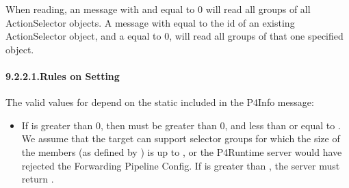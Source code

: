 \documentclass[11pt]{article}
\begin{document}
{%
When reading, an  message with  and
 equal to 0 will read all groups of all ActionSelector objects.  A
message with  equal to the id of an existing ActionSelector
object, and a  equal to 0, will read all groups of that one specified
object.%

\paragraph{9.2.2.1.\hspace*{0.5em}Rules on Setting }\label{sec-max-size-rules}%

\noindent{}The valid values for  depend on the static  included
in the P4Info message:%

\begin{itemize}%

\item{}
If  is greater than 0, then  must be greater than 0,
and less than or equal to . We assume that the target can
support selector groups for which the size of the members (as defined by
) is up to , or the P4Runtime server
would have rejected the Forwarding Pipeline Config. If  is greater
than , the server must return .%


\end{itemize}}
\end{document}
